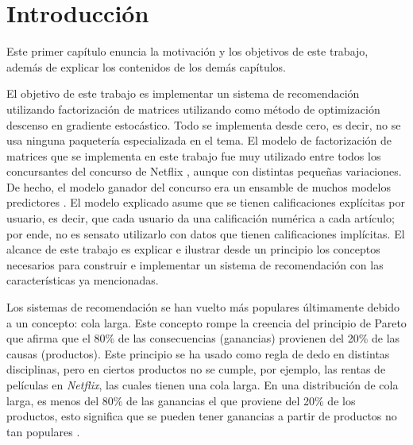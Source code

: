 
\chapter{Introducción}
\label{ch:intro}

Este primer capítulo enuncia la motivación y los objetivos de este trabajo, además de explicar los contenidos de los demás capítulos.

El objetivo de este trabajo es implementar un sistema de recomendación utilizando factorización de matrices utilizando como método de optimización descenso en gradiente estocástico. Todo se implementa desde cero, es decir, no se usa ninguna paquetería especializada en el tema. El modelo de factorización de matrices que se implementa en este trabajo fue muy utilizado entre todos los concursantes del concurso de Netflix \cite{bell2008bellkor}, aunque con distintas pequeñas variaciones. De hecho, el modelo ganador del concurso era un ensamble de muchos modelos predictores \cite{bell2007lessons}. El modelo explicado asume que se tienen calificaciones explícitas por usuario, es decir, que cada usuario da una calificación numérica a cada artículo; por ende, no es sensato utilizarlo con datos que tienen calificaciones implícitas. El alcance de este trabajo es explicar e ilustrar desde un principio los conceptos necesarios para construir e implementar un sistema de recomendación con las características ya mencionadas.

Los sistemas de recomendación se han vuelto más populares últimamente debido a un concepto: cola larga. Este concepto rompe la creencia del principio de Pareto que afirma que el 80\% de las consecuencias (ganancias) provienen del 20\% de las causas (productos). Este principio se ha usado como regla de dedo en distintas disciplinas, pero en ciertos productos no se cumple, por ejemplo, las rentas de películas en \textit{Netflix}, las cuales tienen una cola larga. En una distribución de cola larga, es menos del 80\% de las ganancias el que proviene del 20\% de los productos, esto significa que se pueden tener ganancias a partir de productos no tan populares \cite{anderson2006long}.

